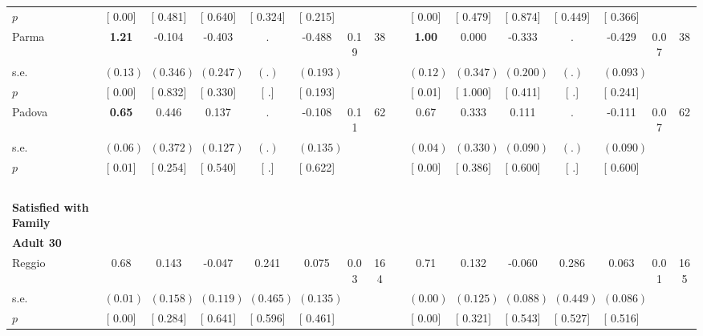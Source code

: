 \begin{longtable}{L{8em} c c c c c c c p{1em} c c c c c c c}
\quad \quad \quad \quad $ p$ & [     0.00] & [    0.481] & [    0.640] & [    0.324] & [    0.215] & & & & [     0.00] & [    0.479] & [    0.874] & [    0.449] & [    0.366] & &  \\[1em]
\quad \quad \quad Parma& \textbf{     1.21} &    -0.104 &    -0.403 &         . &    -0.488 &      0.19 &        38 & & \textbf{     1.00} &     0.000 &    -0.333 &         . &    -0.429 &      0.07 &        38  \\*
\quad \quad \quad \quad s.e.& $ (     0.13)$ & $ (    0.346)$ & $ (    0.247)$ & $ (        .)$ & $ (    0.193)$ & & & & $ (     0.12)$ & $ (    0.347)$ & $ (    0.200)$ & $ (        .)$ & $ (    0.093)$ & &  \\*
\quad \quad \quad \quad $ p$ & [     0.00] & [    0.832] & [    0.330] & [        .] & [    0.193] & & & & [     0.01] & [    1.000] & [    0.411] & [        .] & [    0.241] & &  \\[1em]
\quad \quad \quad Padova& \textbf{     0.65} &     0.446 &     0.137 &         . &    -0.108 &      0.11 &        62 & & 0.67 &     0.333 &     0.111 &         . &    -0.111 &      0.07 &        62  \\*
\quad \quad \quad \quad s.e.& $ (     0.06)$ & $ (    0.372)$ & $ (    0.127)$ & $ (        .)$ & $ (    0.135)$ & & & & $ (     0.04)$ & $ (    0.330)$ & $ (    0.090)$ & $ (        .)$ & $ (    0.090)$ & &  \\*
\quad \quad \quad \quad $ p$ & [     0.01] & [    0.254] & [    0.540] & [        .] & [    0.622] & & & & [     0.00] & [    0.386] & [    0.600] & [        .] & [    0.600] & &  \\[1em]
~\\[1em]
\textbf{Satisfied with Family} \\*
\quad \quad \textbf{Adult 30} & & & & & & & & & & & & & & & \\* 
\quad \quad \quad Reggio& 0.68 &     0.143 &    -0.047 &     0.241 &     0.075 &      0.03 &       164 & & 0.71 &     0.132 &    -0.060 &     0.286 &     0.063 &      0.01 &       165  \\*
\quad \quad \quad \quad s.e.& $ (     0.01)$ & $ (    0.158)$ & $ (    0.119)$ & $ (    0.465)$ & $ (    0.135)$ & & & & $ (     0.00)$ & $ (    0.125)$ & $ (    0.088)$ & $ (    0.449)$ & $ (    0.086)$ & &  \\*
\quad \quad \quad \quad $ p$ & [     0.00] & [    0.284] & [    0.641] & [    0.596] & [    0.461] & & & & [     0.00] & [    0.321] & [    0.543] & [    0.527] & [    0.516] & &  \\[1em]

\end{longtable}
